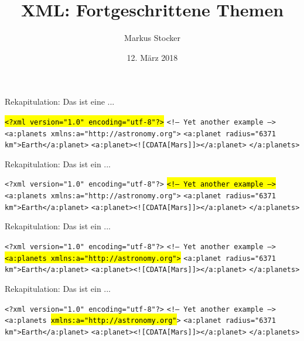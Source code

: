 \documentclass{beamer}
\title{XML: Fortgeschrittene Themen}
\author{Markus Stocker}
\date{12. März 2018}
\makeatletter
\newcommand\SoulColor{%
	\let\set@color\beamerorig@set@color
	\let\reset@color\beamerorig@reset@color}
\makeatother
\begin{document}
\maketitle

\begin{frame}{Rekapitulation: Das ist eine ...}
	
	\SoulColor\hl{\texttt{<?xml version="1.0" encoding="utf-8"?>}} \newline
	\texttt{<!-- Yet another example -->} \newline
	\texttt{<a:planets xmlns:a="http://astronomy.org">} \newline
	\texttt{<a:planet radius="6371 km">Earth</a:planet>} \newline
	\texttt{<a:planet><![CDATA[Mars]]></a:planet>} \newline
	\texttt{</a:planets>}
	
\end{frame}

\begin{frame}{Rekapitulation: Das ist ein ...}
	
	\texttt{<?xml version="1.0" encoding="utf-8"?>} \newline
	\SoulColor\hl{\texttt{<!-- Yet another example -->}} \newline
	\texttt{<a:planets xmlns:a="http://astronomy.org">} \newline
	\texttt{<a:planet radius="6371 km">Earth</a:planet>} \newline
	\texttt{<a:planet><![CDATA[Mars]]></a:planet>} \newline
	\texttt{</a:planets>}
	
\end{frame}

\begin{frame}{Rekapitulation: Das ist ein ...}
	
	\texttt{<?xml version="1.0" encoding="utf-8"?>} \newline
	\texttt{<!-- Yet another example -->} \newline
	\SoulColor\hl{\texttt{<a:planets xmlns:a="http://astronomy.org">}} \newline
	\texttt{<a:planet radius="6371 km">Earth</a:planet>} \newline
	\texttt{<a:planet><![CDATA[Mars]]></a:planet>} \newline
	\texttt{</a:planets>}
	
\end{frame}

\begin{frame}{Rekapitulation: Das ist ein ...}
	
	\texttt{<?xml version="1.0" encoding="utf-8"?>} \newline
	\texttt{<!-- Yet another example -->} \newline
	\texttt{<a:planets \SoulColor\hl{xmlns:a="http://astronomy.org"}>} \newline
	\texttt{<a:planet radius="6371 km">Earth</a:planet>} \newline
	\texttt{<a:planet><![CDATA[Mars]]></a:planet>} \newline
	\texttt{</a:planets>}
	
\end{frame}
\end{document}
